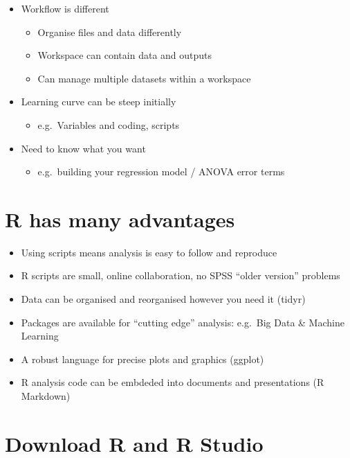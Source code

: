 \documentclass[
]{book}
\providecommand{\tightlist}{%
  \setlength{\itemsep}{0pt}\setlength{\parskip}{0pt}}
\begin{document}
\begin{itemize}
\tightlist
\item
  Workflow is different

  \begin{itemize}
  \tightlist
  \item
    Organise files and data differently
  \item
    Workspace can contain data and outputs
  \item
    Can manage multiple datasets within a workspace
  \end{itemize}
\item
  Learning curve can be steep initially

  \begin{itemize}
  \tightlist
  \item
    e.g.~Variables and coding, scripts
  \end{itemize}
\item
  Need to know what you want

  \begin{itemize}
  \tightlist
  \item
    e.g.~building your regression model / ANOVA error terms
  \end{itemize}
\end{itemize}

\hypertarget{r-has-many-advantages}{%
\section{R has many advantages}\label{r-has-many-advantages}}

\begin{itemize}
\tightlist
\item
  Using scripts means analysis is easy to follow and reproduce
\item
  R scripts are small, online collaboration, no SPSS ``older version'' problems
\item
  Data can be organised and reorganised however you need it (tidyr)
\item
  Packages are available for ``cutting edge'' analysis: e.g.~Big Data \& Machine Learning
\item
  A robust language for precise plots and graphics (ggplot)
\item
  R analysis code can be embdeded into documents and presentations (R Markdown)
\end{itemize}

\hypertarget{download-r-and-r-studio}{%
\section{Download R and R Studio}\label{download-r-and-r-studio}}
\end{document}
